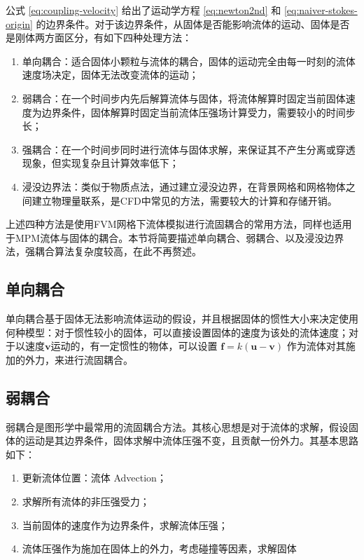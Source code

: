 公式 \ref{eq:coupling-velocity} 给出了运动学方程 \ref{eq:newton2nd} 和 \ref{eq:naiver-stokes-origin} 的边界条件。对于该边界条件，从固体是否能影响流体的运动、固体是否是刚体两方面区分，有如下四种处理方法：
\begin{enumerate}
  \item 单向耦合：适合固体小颗粒与流体的耦合，固体的运动完全由每一时刻的流体速度场决定，固体无法改变流体的运动；
  \item 弱耦合：在一个时间步内先后解算流体与固体，将流体解算时固定当前固体速度为边界条件，固体解算时固定当前流体压强场计算受力，需要较小的时间步长；
  \item 强耦合：在一个时间步同时进行流体与固体求解，来保证其不产生分离或穿透现象，但实现复杂且计算效率低下；
  \item 浸没边界法：类似于物质点法，通过建立浸没边界，在背景网格和网格物体之间建立物理量联系，是CFD中常见的方法，需要较大的计算和存储开销。
\end{enumerate}

上述四种方法是使用FVM网格下流体模拟进行流固耦合的常用方法，同样也适用于MPM流体与固体的耦合。本节将简要描述单向耦合、弱耦合、以及浸没边界法，强耦合算法复杂度较高，在此不再赘述。

\subsection{单向耦合}

单向耦合基于固体无法影响流体运动的假设，并且根据固体的惯性大小来决定使用何种模型：对于惯性较小的固体，可以直接设置固体的速度为该处的流体速度；对于以速度$\mathbf v$运动的，有一定惯性的物体，可以设置 $\mathbf f = k (\mathbf u - \mathbf v)$ 作为流体对其施加的外力，来进行流固耦合。

\subsection{弱耦合}

弱耦合是图形学中最常用的流固耦合方法。其核心思想是对于流体的求解，假设固体的运动是其边界条件，固体求解中流体压强不变，且贡献一份外力。其基本思路如下：
\begin{enumerate}
  \item 更新流体位置：流体 Advection；
  \item 求解所有流体的非压强受力；
  \item 当前固体的速度作为边界条件，求解流体压强；
  \item 流体压强作为施加在固体上的外力，考虑碰撞等因素，求解固体
\end{enumerate}

